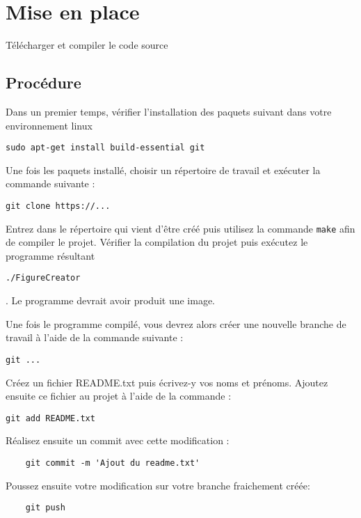 \documentclass[
	12pt, %
]{fphw}
\begin{document}
\section*{Mise en place}

\begin{problem}
	Télécharger et compiler le code source
\end{problem}

\subsection*{Procédure}

Dans un premier temps, vérifier l'installation des paquets suivant dans votre environnement linux
\begin{verbatim}
sudo apt-get install build-essential git
\end{verbatim}

Une fois les paquets installé, choisir un répertoire de travail et exécuter la commande suivante :
\begin{verbatim}
git clone https://...
\end{verbatim}

Entrez dans le répertoire qui vient d'être créé puis utilisez la commande \verb"make" afin de compiler le projet.
Vérifier la compilation du projet puis exécutez le programme résultant \begin{verbatim}./FigureCreator\end{verbatim}. Le programme devrait avoir produit une image.

Une fois le programme compilé, vous devrez alors créer une nouvelle branche de travail à l'aide de la commande suivante :
\begin{verbatim}
git ...
\end{verbatim}

Créez un fichier README.txt puis écrivez-y vos noms et prénoms. Ajoutez ensuite ce fichier au projet à l'aide de la commande :
\begin{verbatim}
git add README.txt
\end{verbatim}

Réalisez ensuite un commit avec cette modification :
\begin{verbatim}
	git commit -m 'Ajout du readme.txt'
\end{verbatim}

Poussez ensuite votre modification sur votre branche fraichement créée:
\begin{verbatim}
	git push
\end{verbatim}
\end{document}
